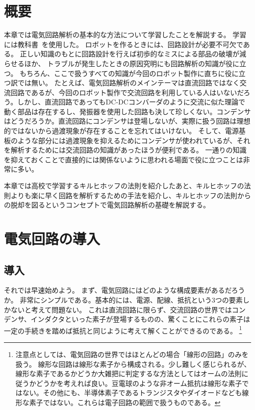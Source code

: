 \documentclass{ltjsreport}
\begin{document}
\section{概要}
本章では電気回路解析の基本的な方法について学習したことを解説する。
学習には教科書~\cite{ElectricCircuit}を使用した。
ロボットを作るときには、回路設計が必要不可欠である。
正しい知識のもとに回路設計を行えば初歩的なミスによる部品の破壊が減らせるほか、
トラブルが発生したときの原因究明にも回路解析の知識が役に立つ。
もちろん、ここで扱うすべての知識が今回のロボット製作に直ちに役に立つ訳では無い。
たとえば、電気回路解析のメインテーマは直流回路ではなく交流回路であるが、今回のロボット製作で交流回路を利用している人はいないだろう。しかし、直流回路であってもDC-DCコンバーダのように交流に似た理論で動く部品は存在するし、発振器を使用した回路も決して珍しくない。コンデンサはどうだろうか。直流回路にコンデンサは登場しないが、実際に扱う回路は理想的ではないから過渡現象が存在することを忘れてはいけない。
そして、電源基板のような部分には過渡現象を抑えるためにコンデンサが使われているが、それを解析するためには交流回路の知識があったほうが便利である。
一通りの知識を抑えておくことで直接的には関係ないように思われる場面で役に立つことは非常に多い。

本章では高校で学習するキルヒホッフの法則を紹介したあと、キルヒホッフの法則よりも楽に早く回路を解析するための手法を紹介し、キルヒホッフの法則からの脱却を図るというコンセプトで電気回路解析の基礎を解説する。


\section{電気回路の導入}
\subsection{導入}
それでは早速始めよう。
まず、電気回路にはどのような構成要素があるだろうか。
非常にシンプルである。基本的には、電源、配線、抵抗という3つの要素しかないと考えて問題ない。
これは直流回路に限らず、交流回路の世界ではコンデンサ、インダクタといった素子が登場するものの、驚くことにこれらの素子は一定の手続きを踏めば抵抗と同じように考えて解くことができるのである。
\footnote{注意点としては、電気回路の世界ではほとんどの場合「線形の回路」のみを扱う。
線形な回路は線形な素子から構成される。少し難しく感じられるが、線形な素子であるかどうか大雑把に判定するな方法としてはオームの法則に従うかどうかを考えれば良い。豆電球のような非オーム抵抗は線形な素子ではない。その他にも、半導体素子であるトランジスタやダイオードなども線形な素子ではない。これらは電子回路の範囲で扱うものである。}
\end{document}
